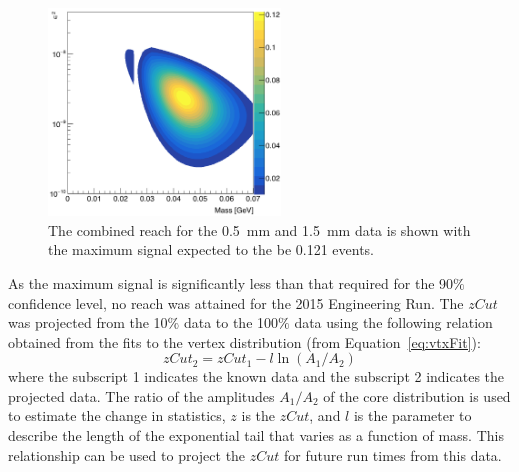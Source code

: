 \begin{figure}[htb]
  \centering
      \includegraphics[width=0.55\textwidth]{pics/results/combinedReach.png}
  \caption[Combined reach from all data for the 2015 Engineering Run]{The combined reach for the 0.5~mm and 1.5~mm data is shown with the maximum signal expected to the be 0.121 events.}
  \label{fig:comb_reach}
\end{figure} 

As the maximum signal is significantly less than that required for the 90$\%$ confidence level, no reach was attained for the 2015 Engineering Run. The $zCut$ was projected from the 10$\%$ data to the 100$\%$ data using the following relation obtained from the fits to the vertex distribution (from Equation~\eqref{eq:vtxFit}):
\begin{equation}
\label{eq:zProjected}
zCut_{2} = zCut_{1} - l\ln(A_1/A_2)
\end{equation}
where the subscript 1 indicates the known data and the subscript 2 indicates the projected data. The ratio of the amplitudes $A_1/A_2$ of the core distribution is used to estimate the change in statistics, $z$ is the $zCut$, and $l$ is the parameter to describe the length of the exponential tail that varies as a function of mass. This relationship can be used to project the $zCut$ for future run times from this data. 

